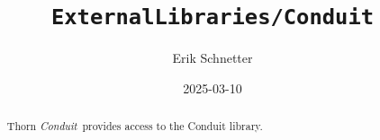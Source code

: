 \documentclass{article}
\begin{document}
\title{\tt ExternalLibraries/Conduit}
\author{Erik Schnetter}
\date{2025-03-10}

\maketitle


\ifx\ThisThorn\undefined
\newcommand{\ThisThorn}{{\it Conduit}}
\else
\renewcommand{\ThisThorn}{{\it Conduit}}
\fi

\begin{abstract}
Thorn \ThisThorn\ provides access to the Conduit library.
\end{abstract}

\end{document}
